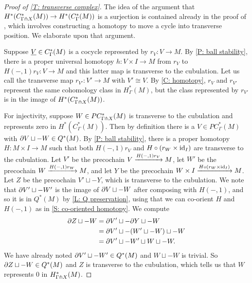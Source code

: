 \begin{proof}[Proof of \cref{T: transverse complex}]
	The idea of the argument that $H^*(C^*_{\Gamma \pitchfork X}(M)) \to H^*(C_\Gamma^*(M))$ is a surjection is contained already in the proof of \cite[Lemma 15]{Lipy14}, which involves constructing a homotopy to move a cycle into transverse position.
	We elaborate upon that argument.

	Suppose $\underline{V} \in C_\Gamma^*(M)$ is a cocycle represented by $r_V \colon V \to M$.
	By \cref{P: ball stability}, there is a proper universal homotopy $h \colon V \times I \to M$ from $r_V$ to $H(-,1)r_{V} \colon V \to M$ and this latter map is transverse to the cubulation.
	Let us call the transverse map $r_{V'} \colon V' \to M$ with $V' \cong V$.
	By \cref{C: homotopy}, $r_V$ and $r_{V'}$ represent the same cohomology class in $H^*_{\Gamma}(M)$, but the class represented by $r_{V'}$ is in the image of $H^*(C^*_{\Gamma \pitchfork X}(M))$.

	For injectivity, suppose $W \in PC^*_{\Gamma \pitchfork X}(M)$ is transverse to the cubulation and represents zero in $H^*(C_\Gamma^*(M))$.
	Then by definition there is a $V \in PC^*_\Gamma(M)$ with $\partial V \sqcup -W \in Q^*(M)$.
	By \cref{P: ball stability}, there is a proper homotopy $H \colon M \times I \to M$ such that both $H(-,1)r_V$ and $H\circ (r_W \times \mathrm{id}_I)$ are transverse to the cubulation.
	Let $V'$ be the precochain $V \xrightarrow{H(-,1)r_V} M$, let $W'$ be the precochain $W \xrightarrow{H(-,1)r_W} M$, and let $Y$ be the precochain $W \times I \xrightarrow{H\circ (r_W \times \mathrm{id}_I)} M$.
	Let $Z$ be the precochain $V' \sqcup -Y$, which is transverse to the cubulation.
	We note that $\partial V' \sqcup -W'$ is the image of $\partial V \sqcup -W$ after composing with $H(-,1)$, and so it is in $Q^*(M)$ by \cref{L: Q preservation}, using that we can co-orient $H$ and $H(-,1)$ as in \cref{S: co-oriented homotopy}.
	We compute
	\begin{align*}
		\partial Z \sqcup -W &= \partial V' \sqcup -\partial Y \sqcup -W\\
		&= \partial V' \sqcup -(W' \sqcup -W) \sqcup -W\\
		&= \partial V' \sqcup -W' \sqcup W \sqcup -W.
	\end{align*}
	We have already noted $\partial V' \sqcup -W' \in Q^*(M)$ and $W \sqcup -W$ is trivial.
	So $\partial Z \sqcup -W \in Q^*(M)$ and $Z$ is transverse to the cubulation, which tells us that $W$ represents $0$ in $H^*_{\Gamma \pitchfork X}(M)$.
\end{proof}

